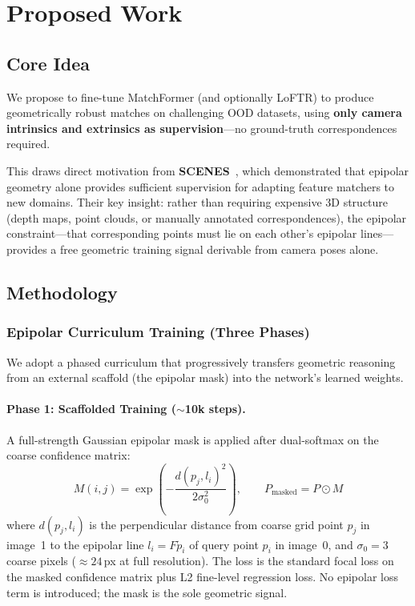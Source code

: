 \documentclass[11pt,a4paper]{article}
\begin{document}
\section{Proposed Work}

\subsection{Core Idea}

We propose to fine-tune MatchFormer (and optionally LoFTR) to produce geometrically robust matches on challenging OOD datasets, using \textbf{only camera intrinsics and extrinsics as supervision}---no ground-truth correspondences required.

This draws direct motivation from \textbf{SCENES}~\cite{kloepfer2024scenes}, which demonstrated that epipolar geometry alone provides sufficient supervision for adapting feature matchers to new domains. Their key insight: rather than requiring expensive 3D structure (depth maps, point clouds, or manually annotated correspondences), the epipolar constraint---that corresponding points must lie on each other's epipolar lines---provides a free geometric training signal derivable from camera poses alone.

\subsection{Methodology}

\subsubsection{Epipolar Curriculum Training (Three Phases)}

We adopt a phased curriculum that progressively transfers geometric reasoning from an external scaffold (the epipolar mask) into the network's learned weights.

\paragraph{Phase 1: Scaffolded Training ($\sim$10k steps).}
A full-strength Gaussian epipolar mask is applied after dual-softmax on the coarse confidence matrix:
\begin{equation}
    M(i,j) = \exp\!\left(-\frac{d(p_j, l_i)^2}{2\sigma_0^2}\right), \qquad P_{\text{masked}} = P \odot M
\end{equation}
where $d(p_j, l_i)$ is the perpendicular distance from coarse grid point $p_j$ in image~1 to the epipolar line $l_i = F\tilde{p}_i$ of query point $p_i$ in image~0, and $\sigma_0 = 3$ coarse pixels ($\approx 24$\,px at full resolution). The loss is the standard focal loss on the masked confidence matrix plus L2 fine-level regression loss. No epipolar loss term is introduced; the mask is the sole geometric signal.
\end{document}
